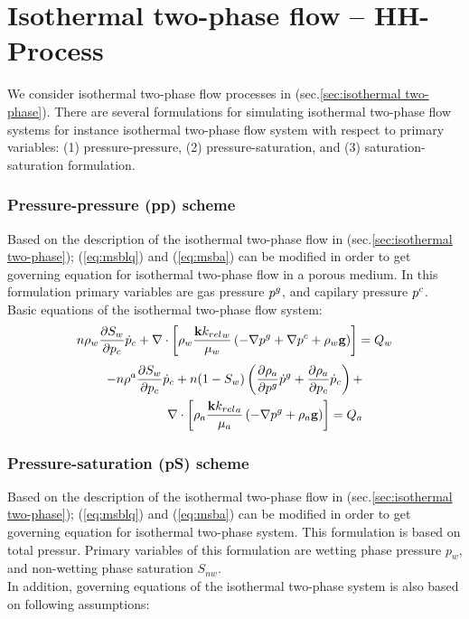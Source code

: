 \chapter{Isothermal two-phase flow -- HH-Process}
We consider isothermal two-phase flow processes in (sec.\ref{sec:isothermal two-phase}).
There are several formulations for simulating isothermal two-phase flow
systems for instance isothermal two-phase flow system with respect to primary
variables: (1) pressure-pressure, (2) pressure-saturation, and
(3) saturation-saturation formulation.


\subsection{Pressure-pressure (pp) scheme}
\label{sec:pp-scheme}
Based on the description of the isothermal two-phase flow in (sec.\ref{sec:isothermal two-phase}); (\ref{eq:msblq}) and (\ref{eq:msba}) can be modified in order to get governing equation for isothermal two-phase flow in a porous medium. In this formulation primary variables are gas pressure $p^g$, and capilary pressure $p^c$. \\
Basic equations of the isothermal two-phase flow system:
\begin{align}
n \rho_w \dfrac{\partial S_w}{\partial p_c} \dot{p}_c +
\nabla \cdot\left[\rho_w\dfrac{{\mathbf k k_{rel}}_{w}}{\mu_w}\left(-\nabla p^{g} +
\nabla{p}^{c} + \rho_w \mathbf g\right)\right] = Q_w
\end{align}
\begin{align}
- n \rho^a \dfrac{\partial S_w}{\partial p_c} \dot{p}_c+
n (1 -S_w)\left(\dfrac{\partial \rho_a}{\partial p^g}\dot{p}^g+\dfrac{\partial \rho_a}{\partial p_c}\dot{p}_c\right)+ \nonumber\\
\nabla \cdot \left[\rho_a\dfrac{{\mathbf k k_{rel}}_a}{\mu_a} \left(-\nabla p^{g} + \rho_a \mathbf g\right) \right] = Q_a
\label{eq:msbl_sim}
\end{align}
\subsection{Pressure-saturation (pS) scheme}
\label{sec:pS-scheme}
Based on the description of the isothermal two-phase flow in (sec.\ref{sec:isothermal two-phase}); (\ref{eq:msblq}) and (\ref{eq:msba}) can be modified in order to get governing equation for isothermal two-phase system. This formulation is based on total pressur. Primary variables of this formulation are wetting phase pressure $p_w$, and non-wetting phase saturation $S_{nw}$.\\
In addition, governing equations of the isothermal two-phase
system is also based on following assumptions:

